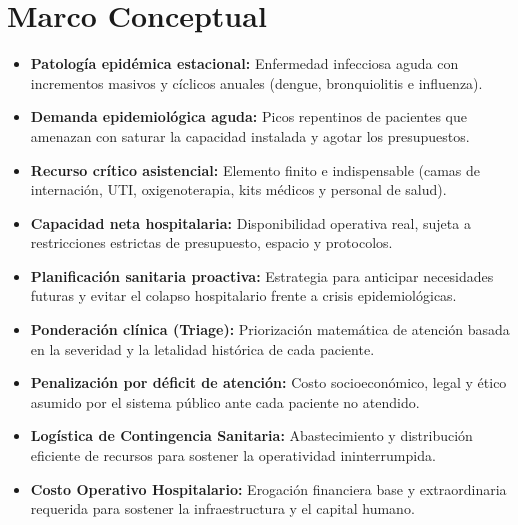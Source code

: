 \documentclass[conference]{IEEEtran}
\begin{document}
\section{Marco Conceptual}
\begin{itemize}
    \item \textbf{Patología epidémica estacional:} Enfermedad infecciosa aguda con incrementos masivos y cíclicos anuales (dengue, bronquiolitis e influenza).
    \item \textbf{Demanda epidemiológica aguda:} Picos repentinos de pacientes que amenazan con saturar la capacidad instalada y agotar los presupuestos.
    \item \textbf{Recurso crítico asistencial:} Elemento finito e indispensable (camas de internación, UTI, oxigenoterapia, kits médicos y personal de salud).
    \item \textbf{Capacidad neta hospitalaria:} Disponibilidad operativa real, sujeta a restricciones estrictas de presupuesto, espacio y protocolos.
    \item \textbf{Planificación sanitaria proactiva:} Estrategia para anticipar necesidades futuras y evitar el colapso hospitalario frente a crisis epidemiológicas.
    \item \textbf{Ponderación clínica (Triage):} Priorización matemática de atención basada en la severidad y la letalidad histórica de cada paciente.
    \item \textbf{Penalización por déficit de atención:} Costo socioeconómico, legal y ético asumido por el sistema público ante cada paciente no atendido.
    \item \textbf{Logística de Contingencia Sanitaria:} Abastecimiento y distribución eficiente de recursos para sostener la operatividad ininterrumpida.
    \item \textbf{Costo Operativo Hospitalario:} Erogación financiera base y extraordinaria requerida para sostener la infraestructura y el capital humano.
\end{itemize}
\end{document}
